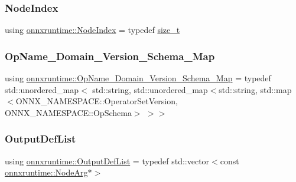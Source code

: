 \subsubsection{\texorpdfstring{Node\+Index}{NodeIndex}}
{\footnotesize\ttfamily using \mbox{\hyperlink{namespaceonnxruntime_af8773b5c12b5d8fd9292eb2e268df760}{onnxruntime\+::\+Node\+Index}} = typedef \mbox{\hyperlink{mlasi_8h_a503efbc1c6e50825320ad909366b78ab}{size\+\_\+t}}}

\mbox{\label{namespaceonnxruntime_a2750a8e8f860d3ebdc37a35cd340b3d8}} 
\subsubsection{\texorpdfstring{Op\+Name\+\_\+\+Domain\+\_\+\+Version\+\_\+\+Schema\+\_\+\+Map}{OpName\_Domain\_Version\_Schema\_Map}}
{\footnotesize\ttfamily using \mbox{\hyperlink{namespaceonnxruntime_a2750a8e8f860d3ebdc37a35cd340b3d8}{onnxruntime\+::\+Op\+Name\+\_\+\+Domain\+\_\+\+Version\+\_\+\+Schema\+\_\+\+Map}} = typedef std\+::unordered\+\_\+map$<$ std\+::string, std\+::unordered\+\_\+map$<$std\+::string, std\+::map$<$O\+N\+N\+X\+\_\+\+N\+A\+M\+E\+S\+P\+A\+C\+E\+::\+Operator\+Set\+Version, O\+N\+N\+X\+\_\+\+N\+A\+M\+E\+S\+P\+A\+C\+E\+::\+Op\+Schema$>$ $>$$>$}

\mbox{\label{namespaceonnxruntime_a4b3c292f33b95d038b5059f6103f287a}} 
\subsubsection{\texorpdfstring{Output\+Def\+List}{OutputDefList}}
{\footnotesize\ttfamily using \mbox{\hyperlink{namespaceonnxruntime_a4b3c292f33b95d038b5059f6103f287a}{onnxruntime\+::\+Output\+Def\+List}} = typedef std\+::vector$<$const \mbox{\hyperlink{classonnxruntime_1_1NodeArg}{onnxruntime\+::\+Node\+Arg}}$\ast$$>$}

\mbox{\label{namespaceonnxruntime_ab899e71c070d3fe82ae09bb53075b258}} 
